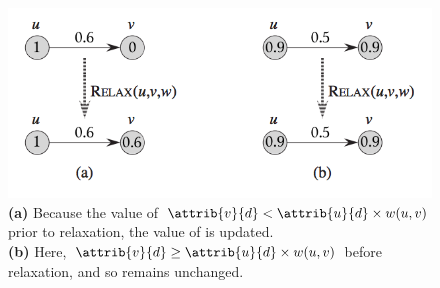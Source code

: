 \begin{homeworkProblem}
\begin{enumerate}[a)]
    \begin{figure}[h]
		\includegraphics[scale=0.8]{Relax}
        \caption[caption]{\textbf{(a)} Because the value of $\attrib{v}{d} < 
        		 \attrib{u}{d} \times w(u, v)$ prior to relaxation, the value of 
                  is updated. 
                 \\\hspace*{1.53cm}\textbf{(b)} Here, $\attrib{v}{d} \geq 
                 \attrib{u}{d} \times w(u, v)$ before relaxation, and so 
                  remains unchanged. }
	\end{figure}
    
    \clearpage
    

\end{enumerate}
\end{homeworkProblem}
